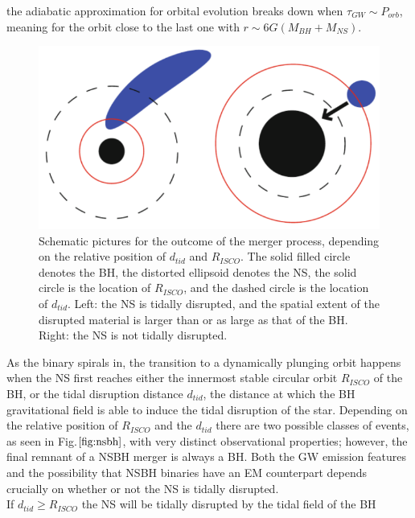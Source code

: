 \documentclass[binding=0.6cm, LaM]{sapthesis}
\begin{document}
        the adiabatic approximation for orbital evolution breaks down when $\tau_{GW} \sim P_{orb}$,
        meaning for the orbit close to the last one with $r \sim 6G(M_{BH}+M_{NS})$.
                 \begin{figure}[H]
                        \label{nsbh}
                        \includegraphics[scale=0.45]{nsbh}
                        \centering
                        \caption{Schematic pictures for the outcome of the merger process, depending on the relative position of $d_{tid}$ and $R_{ISCO}$. The solid filled circle denotes the BH, the distorted ellipsoid denotes the NS, the solid circle is the location of $R_{ISCO}$, and the dashed circle is the location of  $d_{tid}$. Left: the NS is tidally disrupted, and the spatial extent of the disrupted material is larger than or as large as that of the BH. Right: the NS is not tidally disrupted.}
                         \label{fig:nsbh}
                \end{figure}
        As the binary spirals in, the transition to a dynamically plunging orbit happens
        when the NS first reaches either the innermost stable circular orbit $R_{ISCO}$ of the BH, or the tidal disruption distance $d_{tid}$,
        the distance at which the BH gravitational field is able to induce the tidal disruption of the star.
        Depending on the relative position of $R_{ISCO}$ and the $d_{tid}$ there are
        two possible classes of events, as seen in Fig.$\ref{fig:nsbh}$, with very distinct observational properties;
        however, the final remnant of a NSBH merger is always a BH.
        Both the GW emission features and the possibility that NSBH binaries have an EM counterpart
        depends crucially on whether or not the NS is tidally disrupted. \\
        If $d_{tid} \geq R_{ISCO}$ the NS will be tidally disrupted by the tidal field of the BH
\end{document}
